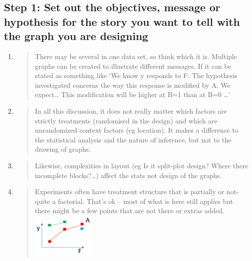 \documentclass[
]{book}
\begin{document}
\hypertarget{step-1-set-out-the-objectives-message-or-hypothesis-for-the-story-you-want-to-tell-with-the-graph-you-are-designing}{%
\subsection{Step 1: Set out the objectives, message or hypothesis for the story you want to tell with the graph you are designing}\label{step-1-set-out-the-objectives-message-or-hypothesis-for-the-story-you-want-to-tell-with-the-graph-you-are-designing}}

\begin{enumerate}
\def\labelenumi{\alph{enumi}.}
\item
  \begin{quote}
  There may be several in one data set, so think which it is. Multiple graphs can be created to illustrate different messages. If it can be stated as something like `We know y responds to F. The hypothesis investigated concerns the way this response is modified by A. We expect\ldots{} This modification will be higher at B=1 than at B=0 \ldots{}'
  \end{quote}
\item
  \begin{quote}
  In all this discussion, it does not really matter which factors are strictly treatments (randomised in the design) and which are unrandomized context factors (eg location). It makes a difference to the statistical analysis and the nature of inference, but not to the drawing of graphs.
  \end{quote}
\item
  \begin{quote}
  Likewise, complexities in layout (eg Is it split-plot design? Where there incomplete blocks?\ldots) affect the stats not design of the graphs.
  \end{quote}
\item
  \begin{quote}
  Experiments often have treatment structure that is partially or not-quite a factorial. That's ok -- most of what is here still applies but there might be a few points that are not there or extras added.
  \includegraphics{img/Picture5.png}
  \end{quote}
\end{enumerate}
\end{document}
